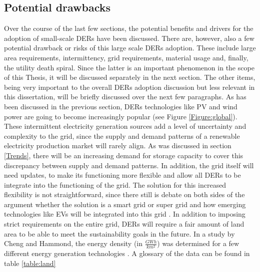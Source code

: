  \subsection{Potential drawbacks}
 Over the course of the last few sections, the potential benefits and drivers for the adoption of small-scale DERs have been discussed. There are, however, also a few potential drawback or risks of this large scale DERs adoption. These include large area requirements, intermittency, grid requirements, material usage and, finally, the utility death spiral. Since the latter is an important phenomenon in the scope of this Thesis, it will be discussed separately in the next section. The other items, being very important to the overall DERs adoption discussion but less relevant in this dissertation, will be briefly discussed over the next few paragraphs.
 \newline \newline \noindent
 As has been discussed in the previous section, DERs technologies like PV and wind power are going to become increasingly popular (see Figure \ref{Figure:global}). These intermittent electricity generation sources add a level of uncertainty and complexity to the grid, since the supply and demand patterns of a renewable electricity production market will rarely align. As was discussed in section \ref{Trends}, there will be an increasing demand for storage capacity to cover this discrepancy between supply and demand patterns. In addition, the grid itself will need updates, to make its functioning more flexible and allow all DERs to be integrate into the functioning of the grid. The solution for this increased flexibility is not straightforward, since there still is debate on both sides of the argument whether the solution is a smart grid or super grid \cite{integration2} and how emerging technologies like EVs will be integrated into this grid \cite{integration1}. 
 \newline \newline \noindent
 In addition to imposing strict requirements on the entire grid, DERs will require a fair amount of land area to be able to meet the sustainability goals in the future. In a study by Cheng and Hammond, the energy density (in $\frac{GWh}{km^2}$) was determined for a few different energy generation technologies \cite{land}. A glossary of the data can be found in table \ref{table:land}
 \noindent 
